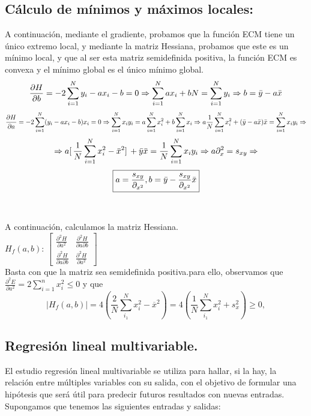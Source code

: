 \documentclass[a4paper,11pt]{article}
\begin{document}
\subsection{Cálculo de mínimos y máximos locales:}
A continuación, mediante el gradiente, probamos que la función ECM tiene
un único extremo local, y mediante la matriz Hessiana, probamos que este es un
mínimo local, y que al ser esta matriz semidefinida positiva, la función ECM es
convexa y el mínimo global es el único mínimo global.
\[\frac{\partial{H}}{\partial{b}}=-2\sum_{i=1}^{N}y_{i}-ax_{i}-b=0\Rightarrow \sum_{i=1}^{N}ax_{i}+bN=\sum_{i=1}^{N}y_{i}\Rightarrow b=\Bar{y}-a\Bar{x}\]
\[\frac{\partial{H}}{\partial{a}}=-2\sum_{i=1}^{N}(y_{i}-ax_{i}-b)x_{i}=0\Rightarrow \sum_{i=1}^{N}x_{i}y_{i}=a\sum_{i=1}^{N}x_{i}^2+b\sum_{i=1}^{N}x_{i}\Rightarrow a \frac{1}{N}\sum_{i=1}^{N}x_{i}^2+(\Bar{y}-a\Bar{x})\Bar{x}=\sum_{i=1}^{N}x_{i}y_{i}\Rightarrow\] 
\[\Rightarrow a[ \,\frac{1}{N} \sum_{i=1}^{N} x_{i}^2-\Bar{x}^2] \,+\Bar{y}\Bar{x}=\frac{1}{N}\sum_{i=1}^{N}x_{i}y_{i}\Rightarrow a\partial_x^2=s_{xy}\Rightarrow\]
\[\boxed{a=\frac{s_{xy}}{\partial_{x^2}}, b=\Bar{y}-\frac{s_{xy}}{\partial_{x^2}}\Bar{x}}\]
\\
\\A continuación, calculamos la matriz Hessiana.\\
$H_f(a,b)$: $
\begin{bmatrix}
    \frac{\partial^2 H}{\partial a^2} & \frac{\partial^2 H}{\partial a \partial b} \\
    \frac{\partial^2 H}{\partial a \partial b} & \frac{\partial^2 H}{\partial a^2}
\end{bmatrix} $\\
Basta con que la matriz sea semidefinida positiva.para ello, observamos que $\frac{\partial^2 E}{\partial a^2}= 2 \sum_{i=1}^n x_{i}^2\leq 0$ y que
$$
|H_f(a,b)|=4\left(\frac{2}{N}\sum_{i_1}^N x_i^2-\overline{x}^2\right)=4\left(\frac{1}{N}\sum_{i_1}^N x_i^2+s_x^2\right)\geq 0,
$$
\subsection{Regresión lineal multivariable.}

El estudio regresión lineal multivariable se utiliza para hallar, si la hay, la relación entre múltiples variables con su salida, con el objetivo de formular una hipótesis que será útil para predecir futuros resultados con nuevas entradas. \\

\noindent
Supongamos que tenemos las siguientes entradas y salidas: 
\end{document}
